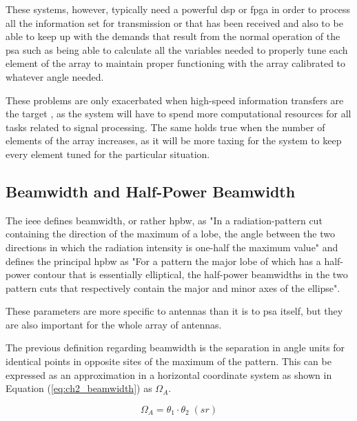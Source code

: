 \par These systems, however, typically need a powerful \ac{dsp} or \ac{fpga} in order to process all the information set for transmission or that has been received and also to be able to keep up with the demands that result from the normal operation of the \ac{psa} such as being able to calculate all the variables needed to properly tune each element of the array to maintain proper functioning with the array calibrated to whatever angle needed. 

\par These problems are only exacerbated when high-speed information transfers are the target \cite{Lu2019ApplicationsSystem}, as the system will have to spend more computational resources for all tasks related to signal processing. The same holds true when the number of elements of the array increases, as it will be more taxing for the system to keep every element tuned for the particular situation.

\subsection{Beamwidth and Half-Power Beamwidth}
\par The \ac{ieee} defines beamwidth, or rather \ac{hpbw}, as "In a radiation-pattern cut containing the direction of the maximum of a lobe, the angle between the two directions in which the radiation intensity is one-half the maximum value" and defines the principal \ac{hpbw} as "For a pattern the major lobe of which has a half-power contour that is essentially elliptical, the half-power beamwidths in the two pattern cuts that respectively contain the major and minor axes of the ellipse"\cite{2014IEEEAntennas}.

\par These parameters are more specific to antennas than it is to \ac{psa} itself, but they are also important for the whole array of antennas. 

\par The previous definition regarding beamwidth is the separation in angle units for identical points in opposite sites of the maximum of the pattern. This can be expressed as an approximation in a horizontal coordinate system as shown in Equation (\ref{eq:ch2_beamwidth}) as $\Omega_{A}$.

\begin{equation}
    \label{eq:ch2_beamwidth}
    \Omega_{A} = \theta_{1}\cdot\theta_{2}\; (sr)
\end{equation}

